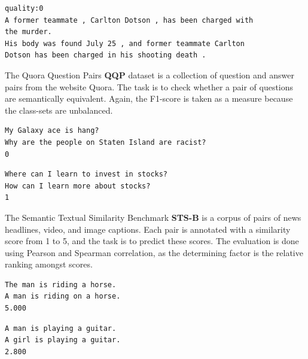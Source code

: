 \documentclass[a4paper,12pt,oneside,openright]{report}
\begin{document}
\quad

\begin{tcolorbox}
\begin{verbatim}
quality:0	
A former teammate , Carlton Dotson , has been charged with 
the murder.	
His body was found July 25 , and former teammate Carlton 
Dotson has been charged in his shooting death .
\end{verbatim}
\end{tcolorbox}

\quad

The Quora Question Pairs \textbf{QQP} \cite{shankar17} dataset is a collection of question and answer pairs from the website Quora. 
The task is to check whether a pair of questions are semantically equivalent.
Again, the F1-score is taken as a measure because the class-sets are unbalanced. \\

\begin{tcolorbox}
\begin{verbatim}
My Galaxy ace is hang?	
Why are the people on Staten Island are racist?	
0
\end{verbatim}
\end{tcolorbox}

\quad

\begin{tcolorbox}
\begin{verbatim}
Where can I learn to invest in stocks?	
How can I learn more about stocks?	
1
\end{verbatim}
\end{tcolorbox}

\quad

The Semantic Textual Similarity Benchmark \textbf{STS-B} \cite{cer2017} is a corpus of pairs of news headlines, video, and image captions.
Each pair is annotated with a similarity score from 1 to 5, and the task is to predict these scores.
The evaluation is done using Pearson and Spearman correlation, as the determining factor is the relative ranking amongst scores.

\quad

\begin{tcolorbox}
\begin{verbatim}
The man is riding a horse.	
A man is riding on a horse.	
5.000
\end{verbatim}
\end{tcolorbox}

\quad

\begin{tcolorbox}
\begin{verbatim}
A man is playing a guitar.
A girl is playing a guitar.	
2.800
\end{verbatim}
\end{tcolorbox}
\end{document}
